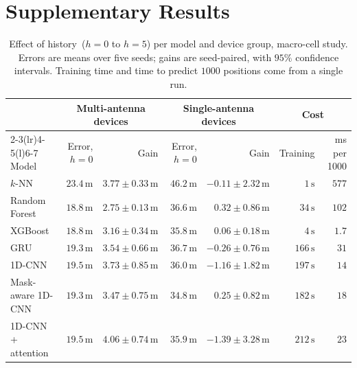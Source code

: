 \section{Supplementary Results}
\label{app:supplementary}

\begin{table}[h]
  \centering
  \caption{Effect of history~($h=0$ to $h=5$) per model and device group, macro-cell study. Errors are means over five seeds; gains are seed-paired, with $95\%$ confidence intervals. Training time and time to predict $1000$ positions come from a single run.}
  \label{tab:history-gain}
  \small
  \begin{tabular}{@{}lrrrrrr@{}}
    \toprule
     & \multicolumn{2}{c}{Multi-antenna devices} & \multicolumn{2}{c}{Single-antenna devices} & \multicolumn{2}{c}{Cost} \\
    \cmidrule(lr){2-3}\cmidrule(lr){4-5}\cmidrule(l){6-7}
    Model & Error, $h=0$ & Gain & Error, $h=0$ & Gain & Training & ms per 1000 \\
    \midrule
    $k$-NN & $23.4\,\text{m}$ & $3.77 \pm 0.33\,\text{m}$ & $46.2\,\text{m}$ & $-0.11 \pm 2.32\,\text{m}$ & $1\,\text{s}$ & $577$ \\
    Random Forest & $18.8\,\text{m}$ & $2.75 \pm 0.13\,\text{m}$ & $36.6\,\text{m}$ & $0.32 \pm 0.86\,\text{m}$ & $34\,\text{s}$ & $102$ \\
    XGBoost & $18.8\,\text{m}$ & $3.16 \pm 0.34\,\text{m}$ & $35.8\,\text{m}$ & $0.06 \pm 0.18\,\text{m}$ & $4\,\text{s}$ & $1.7$ \\
    GRU & $19.3\,\text{m}$ & $3.54 \pm 0.66\,\text{m}$ & $36.7\,\text{m}$ & $-0.26 \pm 0.76\,\text{m}$ & $166\,\text{s}$ & $31$ \\
    1D-CNN & $19.5\,\text{m}$ & $3.73 \pm 0.85\,\text{m}$ & $36.0\,\text{m}$ & $-1.16 \pm 1.82\,\text{m}$ & $197\,\text{s}$ & $14$ \\
    Mask-aware 1D-CNN & $19.3\,\text{m}$ & $3.47 \pm 0.75\,\text{m}$ & $34.8\,\text{m}$ & $0.25 \pm 0.82\,\text{m}$ & $182\,\text{s}$ & $18$ \\
    1D-CNN + attention & $19.5\,\text{m}$ & $4.06 \pm 0.74\,\text{m}$ & $35.9\,\text{m}$ & $-1.39 \pm 3.28\,\text{m}$ & $212\,\text{s}$ & $23$ \\
    \bottomrule
  \end{tabular}
\end{table}

